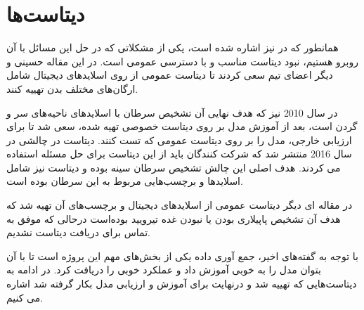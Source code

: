 \section{دیتاست‌ها}
همانطور که در \cite{hosseini2019atlas} نیز اشاره شده است، یکی از مشکلاتی که در حل این مسائل با آن روبرو هستیم، نبود دیتاست مناسب و با دسترسی عمومی است. در این مقاله حسینی و دیگر اعضای تیم سعی کردند تا دیتاست عمومی از روی اسلاید‌های دیجیتال شامل ارگان‌های مختلف بدن تهییه کنند.

در سال 2010 \cite{halicek2019head} نیز که هدف نهایی آن تشخیص سرطان با اسلاید‌های ناحیه‌های سر و گردن است، بعد از آموزش مدل بر روی دیتاست خصوصی تهیه شده، سعی شد تا برای ارزیابی خارجی، مدل را بر روی دیتاست عمومی  که تست کنند. دیتاست  در چالشی در سال 2016 منتشر شد که شرکت کنندگان باید از این دیتاست برای حل مسئله استفاده می کردند. هدف اصلی این چالش تشخیص سرطان سینه بوده و دیتاست نیز شامل اسلاید‌ها و برچسب‌هایی مربوط به این سرطان بوده است.

در مقاله ای دیگر \cite{bohland2021machine} دیتاست عمومی از اسلاید‌های دیجیتال و برچسب‌های آن تهیه شد که هدف آن تشخیص پاپیلاری بودن یا نبودن غده تیرویید بوده‌است درحالی که موفق به تماس برای دریافت دیتاست نشدیم.

با توجه به گفته‌های اخیر، جمع آوری داده یکی از بخش‌های مهم این پروژه است تا با آن بتوان مدل را به خوبی آموزش داد و عملکرد خوبی را دریافت کرد.
در ادامه به دیتاست‌هایی که تهییه شد و درنهایت برای آموزش و ارزیابی مدل بکار گرفته شد اشاره می کنیم.



